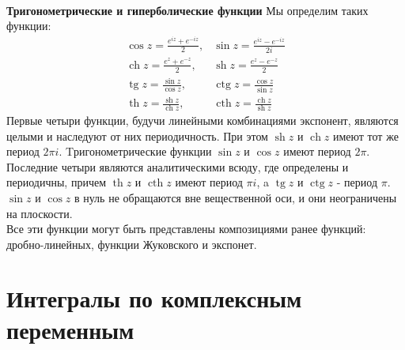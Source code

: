 \documentclass{article}
\begin{document}
	\\
	\textbf{Тригонометрические и гиперболические функции} Мы определим таких функции:
	\begin{equation}
	\begin{aligned}
	\cos z=\frac{e^{i z}+e^{-i z}}{2}, &\sin z=\frac{e^{i z}-e^{-i z}}{2 i} \\
	\operatorname{ch} z=\frac{e^{z}+e^{-z}}{2}, &\operatorname{sh} z=\frac{e^{z}-e^{-z}}{2}\\
	\operatorname{tg} z=\frac{\sin z}{\cos z}, &\operatorname{ctg} z=\frac{\cos z}{\sin z}\\
	\operatorname{th} z=\frac{\operatorname{sh} z}{\operatorname{ch} z}, &\operatorname{cth} z=\frac{\operatorname{ch} z}{\operatorname{sh} z} 
	\end{aligned}
	\end{equation}
	Первые четыри функции, будучи линейными комбинациями экспонент, являются целыми и наследуют от них периодичность. При этом $\operatorname{sh} z$ и $\operatorname{ch}z$ имеют тот же период $2  \pi  i$. Tригонометрические функции $\sin z$ и $\cos z$ имеют период $ 2 \pi$. Последние четыри являются аналитическими всюду, где определены и периодичны, причем $\operatorname{th} z$ и $\operatorname{cth}z$ имеют период $\pi i$, a $\operatorname{tg} z$ и $\operatorname{ctg}z$ - период $ \pi $. \\ 
	$\sin z$ и $\cos z$ в нуль не обращаются вне вещественной оси, и они неограничены на плоскости.\\
	Все эти функции могут быть представлены композициями ранее функций: дробно-линейных, функции Жуковского и экспонет.\\
\section{Интегралы по комплексным переменным}
\end{document}
